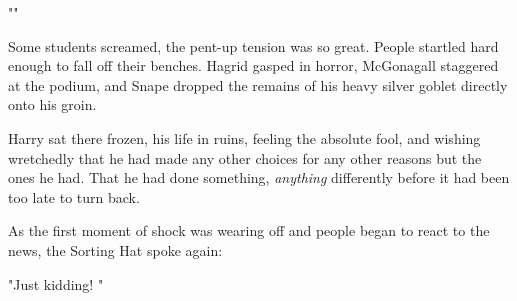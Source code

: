 ""

Some students screamed, the pent-up tension was so great. People startled hard
enough to fall off their benches. Hagrid gasped in horror, McGonagall staggered
at the podium, and Snape dropped the remains of his heavy silver goblet
directly onto his groin.

Harry sat there frozen, his life in ruins, feeling the absolute fool, and
wishing wretchedly that he had made any other choices for any other reasons but
the ones he had. That he had done something, \emph{anything} differently before
it had been too late to turn back.

As the first moment of shock was wearing off and people began to react to the
news, the Sorting Hat spoke again:

"Just kidding! "

